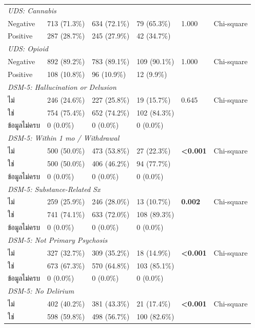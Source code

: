 \begin{table}[htbp]
\begin{tabular}{llllll}
\multicolumn{6}{l}{\textit{UDS: Cannabis}} \\
\quad Negative & 713 (71.3\%) & 634 (72.1\%) & 79 (65.3\%) & 1.000 & Chi-square \\
\quad Positive & 287 (28.7\%) & 245 (27.9\%) & 42 (34.7\%) &  &  \\
\multicolumn{6}{l}{\textit{UDS: Opioid}} \\
\quad Negative & 892 (89.2\%) & 783 (89.1\%) & 109 (90.1\%) & 1.000 & Chi-square \\
\quad Positive & 108 (10.8\%) & 96 (10.9\%) & 12 (9.9\%) &  &  \\
\multicolumn{6}{l}{\textit{DSM-5: Hallucination or Delusion}} \\
\quad ไม่ & 246 (24.6\%) & 227 (25.8\%) & 19 (15.7\%) & 0.645 & Chi-square \\
\quad ใช่ & 754 (75.4\%) & 652 (74.2\%) & 102 (84.3\%) &  &  \\
\quad ข้อมูลไม่ครบ & 0 (0.0\%) & 0 (0.0\%) & 0 (0.0\%) &  &  \\
\multicolumn{6}{l}{\textit{DSM-5: Within 1 mo / Withdrawal}} \\
\quad ไม่ & 500 (50.0\%) & 473 (53.8\%) & 27 (22.3\%) & \textbf{<0.001} & Chi-square \\
\quad ใช่ & 500 (50.0\%) & 406 (46.2\%) & 94 (77.7\%) &  &  \\
\quad ข้อมูลไม่ครบ & 0 (0.0\%) & 0 (0.0\%) & 0 (0.0\%) &  &  \\
\multicolumn{6}{l}{\textit{DSM-5: Substance-Related Sx}} \\
\quad ไม่ & 259 (25.9\%) & 246 (28.0\%) & 13 (10.7\%) & \textbf{0.002} & Chi-square \\
\quad ใช่ & 741 (74.1\%) & 633 (72.0\%) & 108 (89.3\%) &  &  \\
\quad ข้อมูลไม่ครบ & 0 (0.0\%) & 0 (0.0\%) & 0 (0.0\%) &  &  \\
\multicolumn{6}{l}{\textit{DSM-5: Not Primary Psychosis}} \\
\quad ไม่ & 327 (32.7\%) & 309 (35.2\%) & 18 (14.9\%) & \textbf{<0.001} & Chi-square \\
\quad ใช่ & 673 (67.3\%) & 570 (64.8\%) & 103 (85.1\%) &  &  \\
\quad ข้อมูลไม่ครบ & 0 (0.0\%) & 0 (0.0\%) & 0 (0.0\%) &  &  \\
\multicolumn{6}{l}{\textit{DSM-5: No Delirium}} \\
\quad ไม่ & 402 (40.2\%) & 381 (43.3\%) & 21 (17.4\%) & \textbf{<0.001} & Chi-square \\
\quad ใช่ & 598 (59.8\%) & 498 (56.7\%) & 100 (82.6\%) &  &  \\

\end{tabular}
\end{table}
